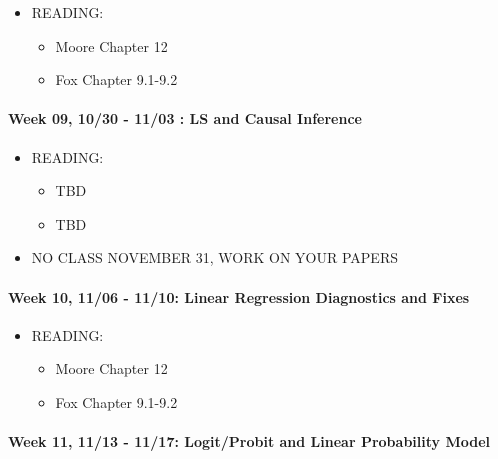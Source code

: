 \documentclass[11pt,]{article}
\providecommand{\tightlist}{%
  \setlength{\itemsep}{0pt}\setlength{\parskip}{0pt}}
\begin{document}
\begin{itemize}
\tightlist
\item
  READING:

  \begin{itemize}
  \tightlist
  \item
    Moore Chapter 12
  \item
    Fox Chapter 9.1-9.2
  \end{itemize}
\end{itemize}

\paragraph{Week 09, 10/30 - 11/03 : LS and Causal
Inference}\label{week-09-1030---1103-ls-and-causal-inference}

\begin{itemize}
\tightlist
\item
  READING:

  \begin{itemize}
  \tightlist
  \item
    TBD
  \item
    TBD
  \end{itemize}
\item
  NO CLASS NOVEMBER 31, WORK ON YOUR PAPERS
\end{itemize}

\paragraph{Week 10, 11/06 - 11/10: Linear Regression Diagnostics and
Fixes}\label{week-10-1106---1110-linear-regression-diagnostics-and-fixes}

\begin{itemize}
\tightlist
\item
  READING:

  \begin{itemize}
  \tightlist
  \item
    Moore Chapter 12
  \item
    Fox Chapter 9.1-9.2
  \end{itemize}
\end{itemize}

\paragraph{Week 11, 11/13 - 11/17: Logit/Probit and Linear Probability
Model}\label{week-11-1113---1117-logitprobit-and-linear-probability-model}
\end{document}
